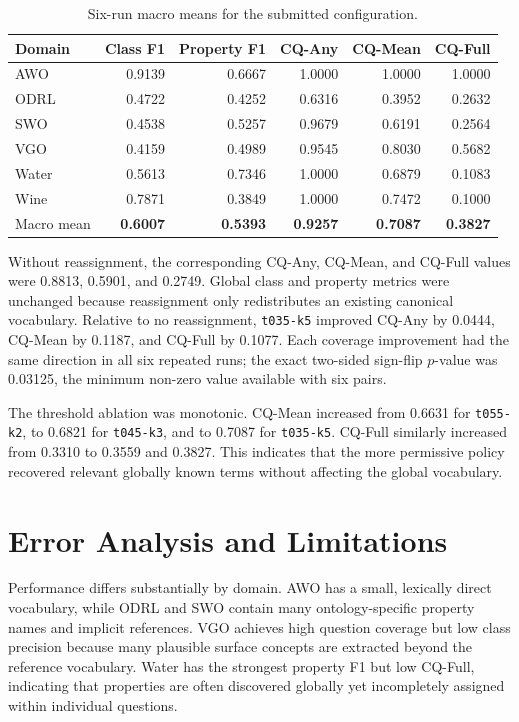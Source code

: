 \documentclass{ceurart}
\begin{document}
\begin{table}[ht]
\caption{Six-run macro means for the submitted configuration.}
\label{tab:results}
\centering
\small
\begin{tabular}{lrrrrr}
\toprule
Domain & Class F1 & Property F1 & CQ-Any & CQ-Mean & CQ-Full \\
\midrule
AWO   & 0.9139 & 0.6667 & 1.0000 & 1.0000 & 1.0000 \\
ODRL  & 0.4722 & 0.4252 & 0.6316 & 0.3952 & 0.2632 \\
SWO   & 0.4538 & 0.5257 & 0.9679 & 0.6191 & 0.2564 \\
VGO   & 0.4159 & 0.4989 & 0.9545 & 0.8030 & 0.5682 \\
Water & 0.5613 & 0.7346 & 1.0000 & 0.6879 & 0.1083 \\
Wine  & 0.7871 & 0.3849 & 1.0000 & 0.7472 & 0.1000 \\
\midrule
Macro mean & \textbf{0.6007} & \textbf{0.5393} & \textbf{0.9257} &
\textbf{0.7087} & \textbf{0.3827} \\
\bottomrule
\end{tabular}
\end{table}

Without reassignment, the corresponding CQ-Any, CQ-Mean, and CQ-Full values
were 0.8813, 0.5901, and 0.2749. Global class and property metrics were
unchanged because reassignment only redistributes an existing canonical
vocabulary. Relative to no reassignment, \texttt{t035-k5} improved CQ-Any by
0.0444, CQ-Mean by 0.1187, and CQ-Full by 0.1077. Each coverage improvement
had the same direction in all six repeated runs; the exact two-sided sign-flip
$p$-value was 0.03125, the minimum non-zero value available with six pairs.

The threshold ablation was monotonic. CQ-Mean increased from 0.6631 for
\texttt{t055-k2}, to 0.6821 for \texttt{t045-k3}, and to 0.7087 for
\texttt{t035-k5}. CQ-Full similarly increased from 0.3310 to 0.3559 and
0.3827. This indicates that the more permissive policy recovered relevant
globally known terms without affecting the global vocabulary.

\section{Error Analysis and Limitations}

Performance differs substantially by domain. AWO has a small, lexically direct
vocabulary, while ODRL and SWO contain many ontology-specific property names
and implicit references. VGO achieves high question coverage but low class
precision because many plausible surface concepts are extracted beyond the
reference vocabulary. Water has the strongest property F1 but low CQ-Full,
indicating that properties are often discovered globally yet incompletely
assigned within individual questions.
\end{document}
